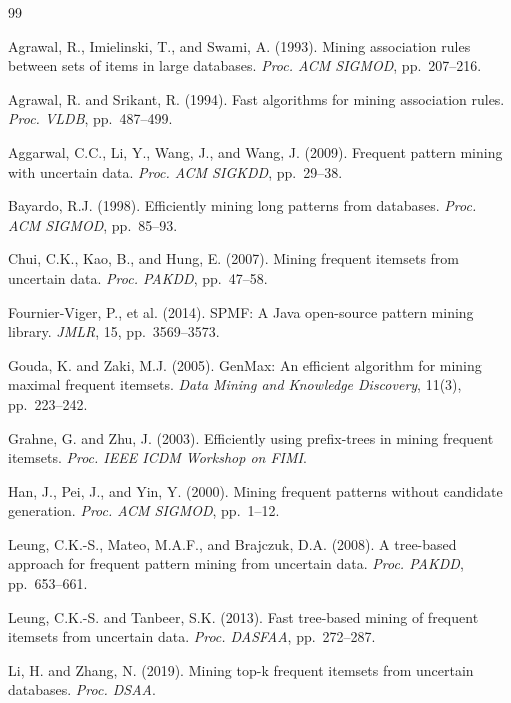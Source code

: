 \documentclass[12pt,a4paper]{report}
\begin{document}
  \begin{thebibliography}{99}

    Agrawal, R., Imielinski, T., and Swami, A. (1993). Mining association rules between sets of items in large databases. \textit{Proc. ACM SIGMOD}, pp.~207--216.

    Agrawal, R. and Srikant, R. (1994). Fast algorithms for mining association rules. \textit{Proc. VLDB}, pp.~487--499.

    Aggarwal, C.C., Li, Y., Wang, J., and Wang, J. (2009). Frequent pattern mining with uncertain data. \textit{Proc. ACM SIGKDD}, pp.~29--38.

    Bayardo, R.J. (1998). Efficiently mining long patterns from databases. \textit{Proc. ACM SIGMOD}, pp.~85--93.

    Chui, C.K., Kao, B., and Hung, E. (2007). Mining frequent itemsets from uncertain data. \textit{Proc. PAKDD}, pp.~47--58.

    Fournier-Viger, P., et al. (2014). SPMF: A Java open-source pattern mining library. \textit{JMLR}, 15, pp.~3569--3573.

    Gouda, K. and Zaki, M.J. (2005). GenMax: An efficient algorithm for mining maximal frequent itemsets. \textit{Data Mining and Knowledge Discovery}, 11(3), pp.~223--242.

    Grahne, G. and Zhu, J. (2003). Efficiently using prefix-trees in mining frequent itemsets. \textit{Proc. IEEE ICDM Workshop on FIMI}.

    Han, J., Pei, J., and Yin, Y. (2000). Mining frequent patterns without candidate generation. \textit{Proc. ACM SIGMOD}, pp.~1--12.

    Leung, C.K.-S., Mateo, M.A.F., and Brajczuk, D.A. (2008). A tree-based approach for frequent pattern mining from uncertain data. \textit{Proc. PAKDD}, pp.~653--661.

    Leung, C.K.-S. and Tanbeer, S.K. (2013). Fast tree-based mining of frequent itemsets from uncertain data. \textit{Proc. DASFAA}, pp.~272--287.

    Li, H. and Zhang, N. (2019). Mining top-k frequent itemsets from uncertain databases. \textit{Proc. DSAA}.


\end{thebibliography}
\end{document}
